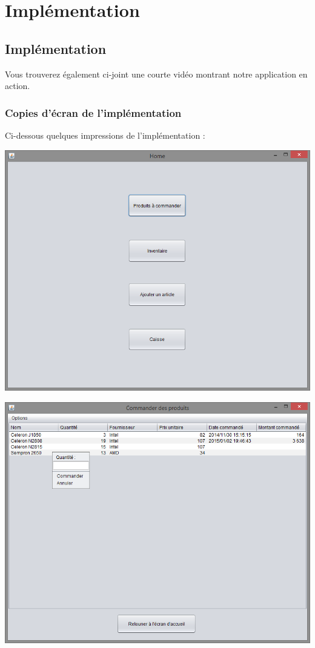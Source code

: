\part{Implémentation}

\chapter{Implémentation}
Vous trouverez également ci-joint une courte vidéo montrant notre application en action.

\section{Copies d'écran de l'implémentation}
Ci-dessous quelques impressions de l'implémentation :

\begin{center}
	\includegraphics[width=14cm]{./Implementation/home}
\end{center}

\begin{center}
	\includegraphics[width=14cm]{./Implementation/acommander}
\end{center}

